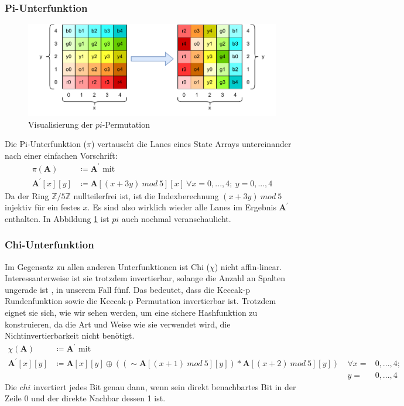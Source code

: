 \subsubsection{Pi-Unterfunktion}
\begin{figure}
    \center
    \includegraphics{images/pi.pdf}
    \caption{Visualisierung der $pi$-Permutation}
    \label{fig:definition_pi}
\end{figure}
Die Pi-Unterfunktion ($\pi$) vertauscht die Lanes eines State Arrays untereinander nach einer einfachen Vorschrift:
\begin{align*}
    \pi (\textbf{A}) & \coloneq \textbf{A}^\prime \text{ mit } \\
    \textbf{A}^\prime[x][y] & \coloneq \textbf{A}[(x + 3y)\ mod\ 5][x]\ \forall x = 0,...,4;\ y = 0,...,4
\end{align*}
Da der Ring $\mathbb{Z}/5\mathbb{Z}$ nullteilerfrei ist, ist die Indexberechnung $(x + 3y)\ mod\ 5$ injektiv für ein festes $x$.
Es sind also wirklich wieder alle Lanes im Ergebnis $\textbf{A}^\prime$ enthalten. In Abbildung \ref{fig:definition_pi} ist $pi$
auch nochmal veranschaulicht.

\subsubsection{Chi-Unterfunktion}
Im Gegensatz zu allen anderen Unterfunktionen ist Chi ($\chi$) nicht affin-linear.
Interessanterweise ist sie trotzdem invertierbar, solange die Anzahl an Spalten ungerade ist \cite{Daemen1995CipherAH}, in unserem Fall fünf. 
Das bedeutet, dass die Keccak-p Rundenfunktion sowie die Keccak-p Permutation invertierbar ist.
Trotzdem eignet sie sich, wie wir sehen werden, um eine sichere Hashfunktion zu konstruieren,
da die Art und Weise wie sie verwendet wird, die Nichtinvertierbarkeit nicht benötigt.
\begin{align*}
    \chi (\textbf{A}) & \coloneq \textbf{A}^\prime \text{ mit } \\
    \textbf{A}^\prime[x][y] & \coloneq \textbf{A}[x][y] \oplus ((\sim \textbf{A}[(x + 1)\ mod\ 5][y]) * \textbf{A}[(x + 2)\ mod\ 5][y])\ & \forall x = & 0,...,4;\\
    && y = & 0,...,4
\end{align*}
Die $chi$ invertiert jedes Bit genau dann, wenn sein direkt benachbartes Bit in der Zeile 0 und der direkte Nachbar dessen 1 ist.

